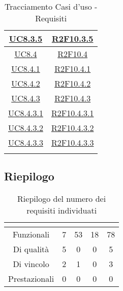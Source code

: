 \begin{longtable}{|c|c|}
	\hline
	\hyperlink{UC8.3.5}{UC8.3.5} & \hyperlink{R2F10.3.5}{R2F10.3.5}\\
	\hline
	\hyperlink{UC8.4}{UC8.4} & \hyperlink{R2F10.4}{R2F10.4}\\
	\hline
	\hyperlink{UC8.4.1}{UC8.4.1} & \hyperlink{R2F10.4.1}{R2F10.4.1}\\
	\hline
	\hyperlink{UC8.4.2}{UC8.4.2} & \hyperlink{R2F10.4.2}{R2F10.4.2}\\
	\hline
	\hyperlink{UC8.4.3}{UC8.4.3} & \hyperlink{R2F10.4.3}{R2F10.4.3}\\
	\hline
	\hyperlink{UC8.4.3.1}{UC8.4.3.1} & \hyperlink{R2F10.4.3.1}{R2F10.4.3.1}\\
	\hline
	\hyperlink{UC8.4.3.2}{UC8.4.3.2} & \hyperlink{R2F10.4.3.2}{R2F10.4.3.2}\\
	\hline
	\hyperlink{UC8.4.3.3}{UC8.4.3.3} & \hyperlink{R2F10.4.3.3}{R2F10.4.3.3}\\
	\hline
	\caption[Tracciamento Casi d'uso - Requisiti]{Tracciamento Casi d'uso - Requisiti}
	\label{tabella:requi-usecase}
\end{longtable}
\renewcommand{\arraystretch}{1}
\clearpage

\subsection{Riepilogo}
\renewcommand{\arraystretch}{1.5}
\begin{table}[H]
	\begin{center}
		\begin{tabular}{|c|c|c|c|c|}
			\hline
			\rowcolor{title_row}
			\textbf{\color{title_text}{Tipologia}}  & \textbf{\color{title_text}{0 Obbligatori}} & \textbf{\color{title_text}{1 Desiderabili}}& \textbf{\color{title_text}{2 Opzionali}} & \textbf{\color{title_text}{Totale}} \\ \hline
			Funzionali & 7 & 53 & 18 & 78\\ \hline
			Di qualità & 5 & 0 & 0 & 5\\ \hline
			Di vincolo & 2 & 1 & 0 & 3\\ \hline
			Prestazionali & 0 & 0 & 0 & 0 \\ \hline
		\end{tabular}
		\caption{Riepilogo del numero dei requisiti individuati\label{}}
	\end{center}
\end{table}
\renewcommand{\arraystretch}{1}




